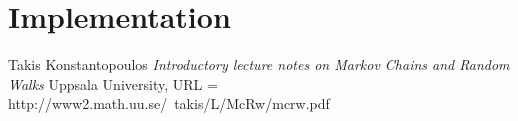 \documentclass{article}
\begin{document}

\section{Implementation}

  \begin{thebibliography}{1}

   Takis Konstantopoulos {\em Introductory lecture notes on
Markov Chains and Random Walks} Uppsala University, URL = http://www2.math.uu.se/~takis/L/McRw/mcrw.pdf
 
  \end{thebibliography}
\end{document}
